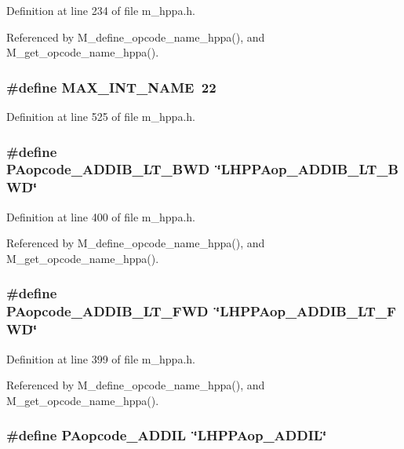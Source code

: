 Definition at line 234 of file m\_\-hppa.h.

Referenced by M\_\-define\_\-opcode\_\-name\_\-hppa(), and M\_\-get\_\-opcode\_\-name\_\-hppa().
\subsubsection{\setlength{\rightskip}{0pt plus 5cm}\#define MAX\_\-INT\_\-NAME~22}\label{m__hppa_8h_63c8b4f0123f5e922a8bbf69b239692e}




Definition at line 525 of file m\_\-hppa.h.
\subsubsection{\setlength{\rightskip}{0pt plus 5cm}\#define PAopcode\_\-ADDIB\_\-LT\_\-BWD~\char`\"{}LHPPAop\_\-ADDIB\_\-LT\_\-BWD\char`\"{}}\label{m__hppa_8h_355c39414b6d898ceb99c3b21f3e3f37}




Definition at line 400 of file m\_\-hppa.h.

Referenced by M\_\-define\_\-opcode\_\-name\_\-hppa(), and M\_\-get\_\-opcode\_\-name\_\-hppa().
\subsubsection{\setlength{\rightskip}{0pt plus 5cm}\#define PAopcode\_\-ADDIB\_\-LT\_\-FWD~\char`\"{}LHPPAop\_\-ADDIB\_\-LT\_\-FWD\char`\"{}}\label{m__hppa_8h_196e35874f7c5f88240d5b6bea088f4c}




Definition at line 399 of file m\_\-hppa.h.

Referenced by M\_\-define\_\-opcode\_\-name\_\-hppa(), and M\_\-get\_\-opcode\_\-name\_\-hppa().
\subsubsection{\setlength{\rightskip}{0pt plus 5cm}\#define PAopcode\_\-ADDIL~\char`\"{}LHPPAop\_\-ADDIL\char`\"{}}\label{m__hppa_8h_ec44da7800a2409368508efd8c494282}





